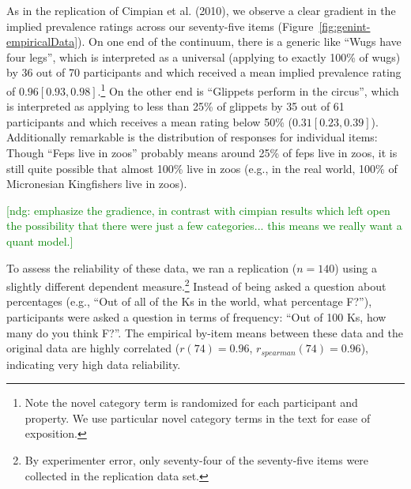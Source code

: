 \documentclass[floatsintext,doc]{apa6}
\let\rmarkdownfootnote\footnote%
\def\footnote{\protect\rmarkdownfootnote}
\newcommand{\ndg}[1]{{\textcolor{Green}{[ndg: #1]}}}
\begin{document}
As in the replication of Cimpian et al. (2010), we observe a clear gradient in the implied prevalence ratings across our seventy-five items (Figure~\ref{fig:genint-empiricalData}).
On one end of the continuum, there is a generic like \enquote{Wugs have four legs}, which is interpreted as a universal (applying to exactly 100\% of wugs) by 36 out of 70 participants and which received a mean implied prevalence rating of \(0.96 [0.93, 0.98]\).\footnote{Note the novel category term is randomized for each participant and property.
  We use particular novel category terms in the text for ease of exposition.}
On the other end is \enquote{Glippets perform in the circus}, which is interpreted as applying to less than 25\% of glippets by 35 out of 61 participants and which receives a mean rating below 50\% (\(0.31 [0.23, 0.39]\)).
Additionally remarkable is the distribution of responses for individual items: Though \enquote{Feps live in zoos} probably means around 25\% of feps live in zoos, it is still quite possible that almost 100\% live in zoos (e.g., in the real world, 100\% of Micronesian Kingfishers live in zoos).

\ndg{emphasize the gradience, in contrast with cimpian results which left open the possibility that there were just a few categories... this means we really want a quant model.}

To assess the reliability of these data, we ran a replication (\(n=140\)) using a slightly different dependent measure.\footnote{By experimenter error, only seventy-four of the seventy-five items were collected in the replication data set.}
Instead of being asked a question about percentages (e.g., \enquote{Out of all of the Ks in the world, what percentage F?}), participants were asked a question in terms of frequency: \enquote{Out of 100 Ks, how many do you think F?}.
The empirical by-item means between these data and the original data are highly correlated (\(r(74) = 0.96\), \(r_{spearman}(74)= 0.96\)), indicating very high data reliability.
\end{document}
